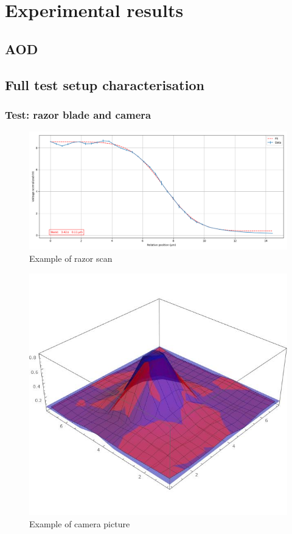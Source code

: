 \documentclass[english, a4paper, 12pt, twoside]{book}
\numberwithin{equation}{section} %
\begin{document}








\chapter{Experimental results}
\section{AOD}
\section{Full test setup characterisation}
\subsection{Test: razor blade and camera}
\begin{figure}[H]
\centering
\includegraphics[width=\textwidth]{img/prova7}
\caption{Example of razor scan}
\end{figure}
\begin{figure}[H]
\centering
\includegraphics[width=\textwidth]{img/camera}
\caption{Example of camera picture}
\end{figure}
\end{document}
